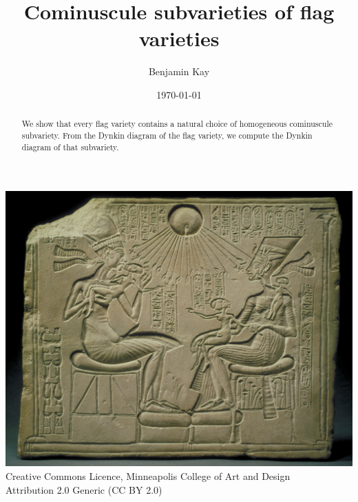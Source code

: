 \documentclass[a4paper,10pt]{amsart}
\title{Cominuscule subvarieties of flag varieties}
\author{\texorpdfstring{Benjamin \scotsMc{}Kay}{Benjamin McKay}}
\date{\today}
\theoremstyle{remark}
\begin{document}
\begin{abstract}
We show that every flag variety contains a natural choice of homogeneous cominuscule subvariety.
From the Dynkin diagram of the flag variety, we compute the Dynkin diagram of that subvariety.
\end{abstract}
\maketitle
\begin{center}
\tiny
\includegraphics[width=\textwidth]{aten}
Creative Commons Licence, Minneapolis College of Art and Design \\
Attribution 2.0 Generic (CC BY 2.0)
\end{center}
\newpage
\begin{center}
\tableofcontents
\end{center}
\end{document}
